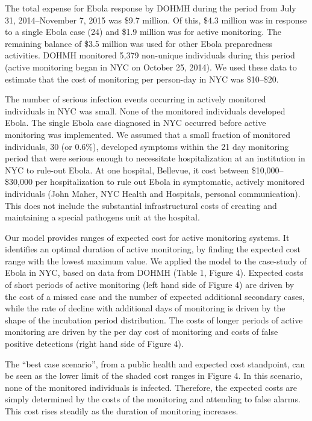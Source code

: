 \documentclass[]{article}
\begin{document}
The total expense for Ebola response by DOHMH during the period from
July 31, 2014--November 7, 2015 was \$9.7 million. Of this, \$4.3
million was in response to a single Ebola case (24) and \$1.9 million
was for active monitoring. The remaining balance of \$3.5 million was
used for other Ebola preparedness activities. DOHMH monitored 5,379
non-unique individuals during this period (active monitoring began in
NYC on October 25, 2014). We used these data to estimate that the cost
of monitoring per person-day in NYC was \$10--\$20.

The number of serious infection events occurring in actively monitored
individuals in NYC was small. None of the monitored individuals
developed Ebola. The single Ebola case diagnosed in NYC occurred before
active monitoring was implemented. We assumed that a small fraction of
monitored individuals, 30 (or 0.6\%), developed symptoms within the 21
day monitoring period that were serious enough to necessitate
hospitalization at an institution in NYC to rule-out Ebola. At one
hospital, Bellevue, it cost between \$10,000--\$30,000 per
hospitalization to rule out Ebola in symptomatic, actively monitored
individuals (John Maher, NYC Health and Hospitals, personal
communication). This does not include the substantial infrastructural
costs of creating and maintaining a special pathogens unit at the
hospital.

Our model provides ranges of expected cost for active monitoring
systems. It identifies an optimal duration of active monitoring, by
finding the expected cost range with the lowest maximum value. We
applied the model to the case-study of Ebola in NYC, based on data from
DOHMH (Table 1, Figure 4). Expected costs of short periods of active
monitoring (left hand side of Figure 4) are driven by the cost of a
missed case and the number of expected additional secondary cases, while
the rate of decline with additional days of monitoring is driven by the
shape of the incubation period distribution. The costs of longer periods
of active monitoring are driven by the per day cost of monitoring and
costs of false positive detections (right hand side of Figure 4).

The ``best case scenario'', from a public health and expected cost
standpoint, can be seen as the lower limit of the shaded cost ranges in
Figure 4. In this scenario, none of the monitored individuals is
infected. Therefore, the expected costs are simply determined by the
costs of the monitoring and attending to false alarms. This cost rises
steadily as the duration of monitoring increases.
\end{document}
